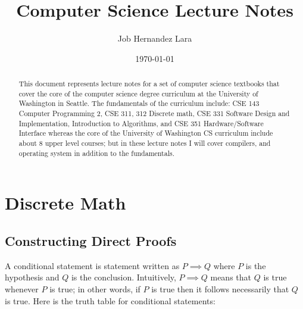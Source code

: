 \documentclass[10pt]{article}
\title{Computer Science Lecture Notes}
\author{Job Hernandez Lara}
\date{\today}
\begin{document}
\maketitle \tableofcontents 


\begin{abstract}
This document represents lecture notes for a set of computer science textbooks that cover the core of the computer science degree curriculum at the University of Washington in Seattle. The fundamentals of the curriculum include: CSE 143 Computer Programming 2, CSE 311, 312 Discrete math, CSE 331 Software Design and Implementation, Introduction to Algorithms, and CSE 351 Hardware/Software Interface whereas the core of the University of Washington CS curriculum include about 8 upper level courses; but in these lecture notes I will cover compilers, and operating system in addition to the fundamentals.
\end{abstract}

\section{Discrete Math}

\subsection{Constructing Direct Proofs}
A conditional statement is statement written as $P\implies Q$ where $P$ is the hypothesis and $ Q $ is the conclusion. Intuitively, $P \implies Q$ means that $Q$ is true whenever $P$ is true; in other words, if $P$ is true then it follows necessarily that $Q$ is true. Here is the truth table for conditional statements:
\end{document}
